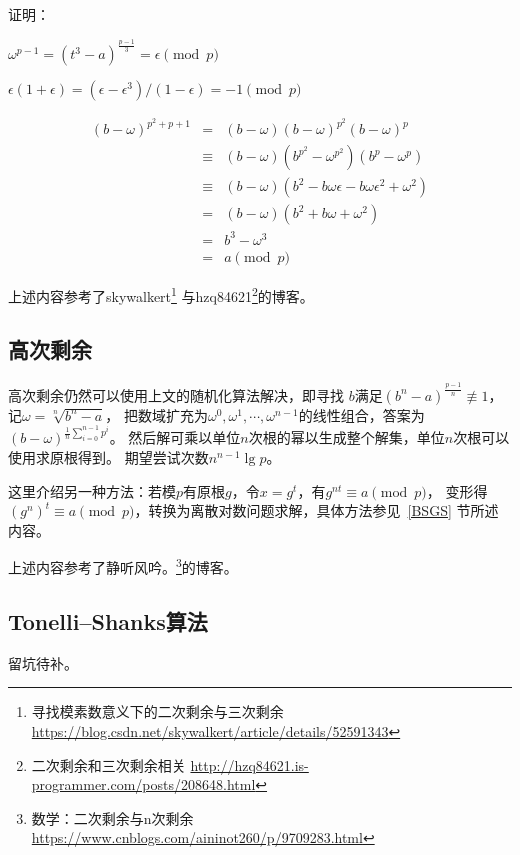 证明：

\begin{lemma}
    $\omega^{p-1}=(t^3-a)^\frac{p-1}{3}=\epsilon \pmod{p}$
\end{lemma}

\begin{lemma}
    $\epsilon(1+\epsilon)=(\epsilon-\epsilon^3)/(1-\epsilon)= -1 \pmod{p}$
\end{lemma}

\begin{eqnarray*}
    (b-\omega)^{p^2+p+1}&=&(b-\omega)(b-\omega)^{p^2}(b-\omega)^p\\
    &\equiv&(b-\omega)(b^{p^2}-\omega^{p^2})(b^p-\omega^p)\\
    &\equiv&(b-\omega)(b^2-b\omega\epsilon-b\omega\epsilon^2+\omega^2)\\
    &=&(b-\omega)(b^2+b\omega+\omega^2)\\
    &=&b^3-\omega^3\\
    &=&a \pmod{p}
\end{eqnarray*}

上述内容参考了skywalkert\footnote{
  寻找模素数意义下的二次剩余与三次剩余
  \url{https://blog.csdn.net/skywalkert/article/details/52591343}
}
与hzq84621\footnote{
    二次剩余和三次剩余相关
    \url{http://hzq84621.is-programmer.com/posts/208648.html}
}的博客。
\subsection{高次剩余}
高次剩余仍然可以使用上文的随机化算法解决，即寻找
$b$满足$(b^n-a)^\frac{p-1}{n}\not \equiv 1$，记$\omega=\sqrt[n]{b^n-a}$，
把数域扩充为$\omega^0,\omega^1,\cdots,\omega^{n-1}$的线性组合，答案为
$(b-\omega)^{\frac{1}{n} \sum_{i=0}^{n-1}{p^i}}$。
然后解可乘以单位$n$次根的幂以生成整个解集，单位$n$次根可以使用求原根得到。
期望尝试次数$n^{n-1}\lg p$。

这里介绍另一种方法：若模$p$有原根$g$，令$x=g^t$，有$g^{nt}\equiv a\pmod{p}$，
变形得$(g^n)^t\equiv a \pmod{p}$，转换为离散对数问题求解，具体方法参见~\ref{BSGS}
节所述内容。

上述内容参考了静听风吟。\footnote{
    数学：二次剩余与n次剩余
    \url{https://www.cnblogs.com/aininot260/p/9709283.html}
}的博客。
\subsection{Tonelli–Shanks算法}
留坑待补。

